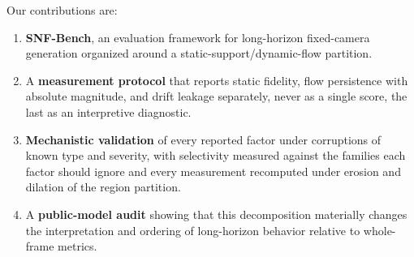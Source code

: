 Our contributions are:
\begin{enumerate}
\item \textbf{SNF-Bench}, an evaluation framework for long-horizon fixed-camera generation organized around a static-support/dynamic-flow partition.
\item A \textbf{measurement protocol} that reports static fidelity, flow persistence with absolute magnitude, and drift leakage separately, never as a single score, the last as an interpretive diagnostic.
\item \textbf{Mechanistic validation} of every reported factor under corruptions of known type and severity, with selectivity measured against the families each factor should ignore and every measurement recomputed under erosion and dilation of the region partition.
\item A \textbf{public-model audit} showing that this decomposition materially changes the interpretation and ordering of long-horizon behavior relative to whole-frame metrics.
\end{enumerate}
